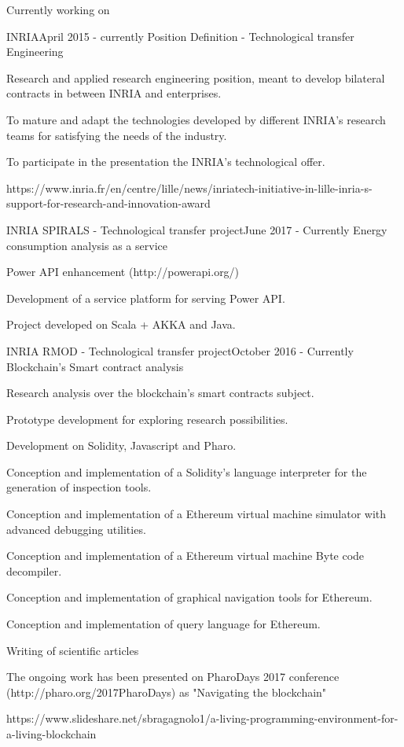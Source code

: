 \documentclass{resume} %
\begin{document}
\begin{rSection}{Currently working on}

	\begin{rSubsection}{INRIA}{April 2015 - currently }{Position Definition - Technological transfer Engineering}
		\item Research and applied research engineering position, meant to develop bilateral contracts in between INRIA and enterprises.
		\item To mature and adapt the technologies developed by different INRIA's research teams for satisfying the needs of the industry. 
		\item To participate in the presentation the INRIA's technological offer.
		\item https://www.inria.fr/en/centre/lille/news/inriatech-initiative-in-lille-inria-s-support-for-research-and-innovation-award
	\end{rSubsection}
	
	\begin{rSubsection}{INRIA SPIRALS - Technological transfer project}{June 2017 - Currently }{Energy consumption analysis as a service}
		\item 
		\item Power API enhancement (http://powerapi.org/) 
		\item Development of a service platform for serving Power API. 
		\item Project developed on Scala + AKKA and Java. 
	\end{rSubsection}
	
	\begin{rSubsection}{INRIA RMOD - Technological transfer project}{October 2016 - Currently }{Blockchain's Smart contract analysis }
		\item 
		\item Research analysis over the blockchain's smart contracts subject.
		\item Prototype development for exploring research possibilities.
		\item Development on Solidity, Javascript and Pharo.
		\item Conception and implementation of a Solidity's language interpreter for the generation of inspection tools.
		\item Conception and implementation of a Ethereum virtual machine simulator with advanced debugging utilities. 
		\item Conception and implementation of a Ethereum virtual machine Byte code decompiler. 
		\item Conception and implementation of graphical navigation tools for Ethereum. 
		\item Conception and implementation of query language for Ethereum. 
		\item Writing of scientific articles
		\item The ongoing work has been presented on PharoDays 2017 conference  (http://pharo.org/2017PharoDays) as "Navigating the blockchain"
		\item https://www.slideshare.net/sbragagnolo1/a-living-programming-environment-for-a-living-blockchain
	\end{rSubsection}
	

\end{rSection}
\end{document}
